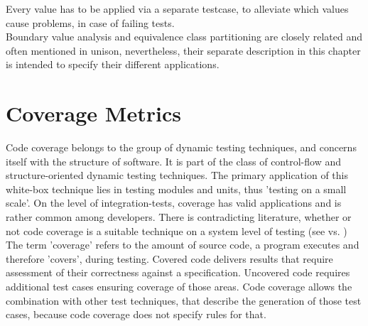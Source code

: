 	
	Every value has to be applied via a separate testcase, to alleviate which values cause problems, in case of failing tests. \\
	Boundary value analysis and equivalence class partitioning are closely related and often mentioned in unison, nevertheless, their separate description in this chapter is intended to specify their different applications.
		

	

\pagebreak	
	\section{Coverage Metrics}
	Code coverage belongs to the group of dynamic testing techniques, and concerns itself with the structure of software. It is part of the class of control-flow and structure-oriented dynamic testing techniques. The primary application of this white-box technique lies in testing modules and units, thus 'testing on a small scale'. On the level of integration-tests, coverage has valid applications and is rather common among developers. There is contradicting literature, whether or not code coverage is a suitable technique on a system level of testing (see \cite{Tian2005} vs. \cite{Liggesmeyer2002} ) \\
	The term 'coverage' refers to the amount of source code, a program executes and therefore 'covers', during testing. Covered code delivers results that require assessment of their correctness against a specification. Uncovered code requires additional test cases ensuring coverage of those areas. Code coverage allows the combination with other test techniques, that describe the generation of those test cases, because code coverage does not specify rules for that. \\
 	
